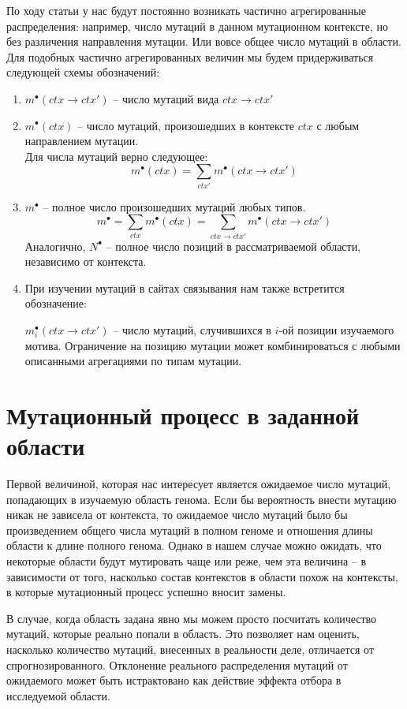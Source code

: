 \documentclass[a4paper]{article}
\newcommand\sumctx{\sum_{ctx}}
\newcommand\dirctx{ctx\to ctx'}
\newcommand\sumdirctx{\sum_{\dirctx}}
\newcommand\sumdir{\sum_{ctx'}}
\begin{document}
По ходу статьи у нас будут постоянно возникать частично агрегированные распределения: например, число мутаций в данном мутационном контексте, но без различения направления мутации. Или вовсе общее число мутаций в области. Для подобных частично агрегированных величин мы будем придерживаться следующей схемы обозначений:
\begin{enumerate}
	\item $m^{\bullet}(\dirctx)$ -- число мутаций вида $\dirctx$
	
	\item $m^{\bullet}(ctx)$ -- число мутаций, произошедших в контексте $ctx$ с любым направлением мутации.\\
	Для числа мутаций верно следующее:
	$$m^{\bullet}(ctx) = \sumdir m^{\bullet}(\dirctx)$$
	
	\item $m^{\bullet}$ -- полное число произошедших мутаций любых типов.
	$$m^{\bullet} = \sumctx m^{\bullet}(ctx) = \sumdirctx m^{\bullet}(\dirctx)$$
	Аналогично, $N^{\bullet}$ -- полное число позиций в рассматриваемой области, независимо от контекста.

	\item При изучении мутаций в сайтах связывания нам также встретится обозначение:

	$m_i^{\bullet}(\dirctx)$ -- число мутаций, случившихся в $i$-ой позиции изучаемого мотива. Ограничение на позицию мутации может комбинироваться с любыми описанными агрегациями по типам мутации.
\end{enumerate}


\section*{Мутационный процесс в заданной области}
Первой величиной, которая нас интересует является ожидаемое число мутаций, попадающих в изучаемую область генома. Если бы вероятность внести мутацию никак не зависела от контекста, то ожидаемое число мутаций было бы произведением общего числа мутаций в полном геноме и отношения длины области к длине полного генома. Однако в нашем случае можно ожидать, что некоторые области будут мутировать чаще или реже, чем эта величина -- в зависимости от того, насколько состав контекстов в области похож на контексты, в которые мутационный процесс успешно вносит замены.

В случае, когда область задана явно мы можем просто посчитать количество мутаций, которые реально попали в область. Это позволяет нам оценить, насколько количество мутаций, внесенных в реальности деле, отличается от спрогнозированного. Отклонение реального распределения мутаций от ожидаемого может быть истрактовано как действие эффекта отбора в исследуемой области.
\end{document}
